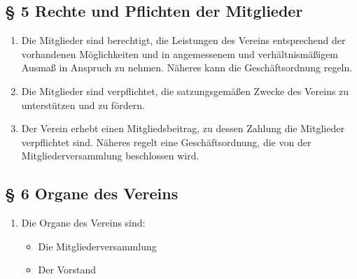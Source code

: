 ﻿\documentclass[10pt,a4paper]{scrartcl}
\begin{document}
\subsection*{§ 5 Rechte und Pflichten der Mitglieder}
\begin{enumerate}
        \item Die Mitglieder sind berechtigt, die Leistungen des Vereins entsprechend der vorhandenen
                Möglichkeiten und in angemessenem und verhältnismäßigem Ausmaß in Anspruch zu nehmen.
                Nä\-he\-res kann die Geschäftsordnung regeln.
        \item Die Mitglieder sind verpflichtet, die satzungsgemäßen Zwecke des Vereins zu unterstützen
                und zu fördern.
        \item Der Verein erhebt einen Mitgliedsbeitrag, zu dessen Zahlung die Mitglieder verpflichtet
                sind. Näheres regelt eine Geschäftsordnung, die von der Mitgliederversammlung beschlossen
                wird.
        
\end{enumerate}
%
%
\subsection*{§ 6 Organe des Vereins }
\begin{enumerate}
        \item Die Organe des Vereins sind:
                \begin{itemize}
                        \item Die Mitgliederversammlung
                        \item Der Vorstand
                \end{itemize}
\end{enumerate}
%
%
\end{document}
